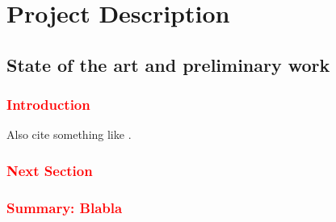 \documentclass[a4paper,11pt,numbers=noenddot,parskip=half-]{scrreprt}
\begin{document}
\addtocounter{chapter}{1}

\chapter{Project Description}

\section{State of the art and preliminary work}\label{sec:stateofart}


\subsection*{\textcolor{red}{Introduction}}\label{sec:stateofart:intro}
\myblindtext[2]

Also cite something like \citet{1973A&A....24..337S}.


\subsection*{\textcolor{red}{Next Section}}\label{sec:stateofart:nextsection}
\myblindtext[8]

\begin{figure}[ht]
\begin{center}
  \caption{\myblindtext}
  \label{fig:somefigure}
\end{center}
\end{figure}


\subsection*{\textcolor{red}{Summary: Blabla}}\label{sec:stateofart:summary}
\myblindtext[2]
\end{document}

